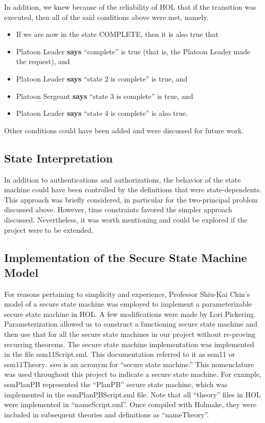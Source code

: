 In addition, we knew because of the reliability of HOL that if the transition was executed, then
all of the said conditions above were met, namely.\\

\begin{itemize}
\item If we are now in the state COMPLETE, then it is also true that
\item Platoon Leader \textbf{says} “complete” is true (that is, the Platoon Leader made the request), and
\item Platoon Leader \textbf{says} “state 2 is complete” is true, and
\item Platoon Sergeant \textbf{says} “state 3 is complete” is true, and
  \item Platoon Leader \textbf{says} “state 4 is complete” is also true.
  \end{itemize}
  Other conditions could have been added and were discussed for future work.

\subsection{State Interpretation}
\label{sec:state-interpretation}

In addition to authentications and authorizations, the behavior of the state machine could have
been controlled by the definitions that were state-dependents. This approach was briefly considered,
in particular for the two-principal problem discussed above. However, time constraints favored the
simpler approach discussed. Nevertheless, it was worth mentioning and could be explored if the project
were to be extended.

\subsection{Implementation of the Secure State Machine Model}
\label{sec:impl-secure-state}

For reasons pertaining to simplicity and experience, Professor Shiu-Kai Chin’s model of
a secure state machine was employed to implement a parameterizable secure state machine in
HOL. A few modifications were made by Lori Pickering. Parameterization allowed us to construct
a functioning secure state machine and then use that for all the secure state machines in our
project without re-proving recurring theorems. The secure state machine implementation was
implemented in the file ssm11Script.sml. This documentation referred to it as ssm11 or ssm11Theory.
\textit{ssm} is an acronym for “secure state machine.” This nomenclature was used throughout this project
to indicate a secure state machine. For example, ssmPlanPB represented the “PlanPB” secure state
machine, which was implemented in the ssmPlanPBScript.sml file. Note that all “theory” files in
HOL were implemented in “nameScript.sml”. Once compiled with Holmake, they were included in
subsequent theories and definitions as “nameTheory”.\\

